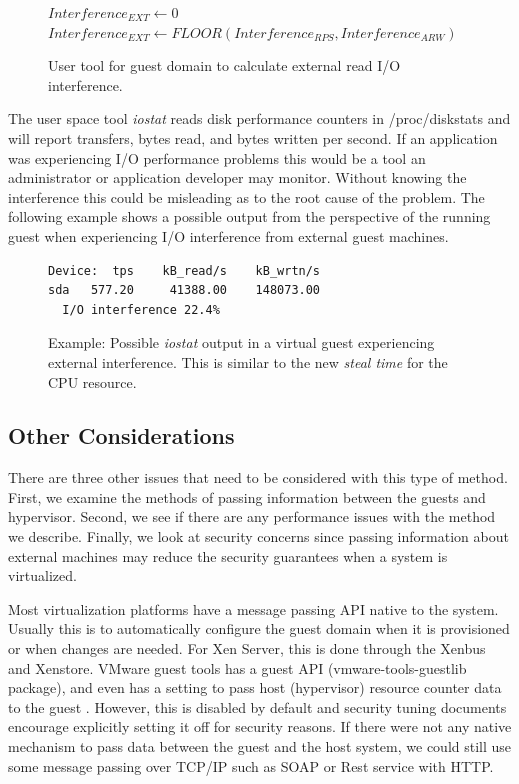 \begin{figure}[h]
\begin{algorithmic}[H]
 \STATE $Interference_{EXT} \gets 0$
 	\STATE $Interference_{EXT} \gets FLOOR(Interference_{RPS}, Interference_{ARW})$  
 \ENDIF
\end{algorithmic}
\label{alg2}
\caption{User tool for guest domain to calculate external read I/O interference.}
\end{figure}

The user space tool \emph{iostat} reads disk performance counters in /proc/diskstats and will report transfers, bytes read, and bytes written per second.  If an application was experiencing I/O performance problems this would be a tool an administrator or application developer may monitor.  Without knowing the interference this could be misleading as to the root cause of the problem.  The following example shows a possible output from the perspective of the running guest when experiencing I/O interference from external guest machines.

\begin{figure}[h]
\begin{Verbatim}
Device:  tps    kB_read/s    kB_wrtn/s
sda   577.20     41388.00    148073.00
  I/O interference 22.4%     
\end{Verbatim}
\label{fig:iostat}
\caption{Example:  Possible \emph{iostat} output in a virtual guest experiencing external interference.  This is similar to the new \emph{steal time} for the CPU resource.}
\end{figure}

\subsection{Other Considerations}
There are three other issues that need to be considered with this type of method.  First, we examine the methods of passing information between the guests and hypervisor.  Second, we see if there are any performance issues with the method we describe.  Finally, we look at security concerns since passing information about external machines may reduce the security guarantees when a system is virtualized.

Most virtualization platforms have a message passing API native to the system.  Usually this is to automatically configure the guest domain when it is provisioned or when changes are needed.  For Xen Server, this is done through the Xenbus and Xenstore.  VMware guest tools has a guest API (vmware-tools-guestlib package), and even has a setting to pass host (hypervisor) resource counter data to the guest \cite{vmwarepubs}.  However, this is disabled by default and security tuning documents encourage explicitly setting it off for security reasons. If there were not any native mechanism to pass data between the guest and the host system, we could still use some message passing over TCP/IP such as SOAP or Rest service with HTTP.

